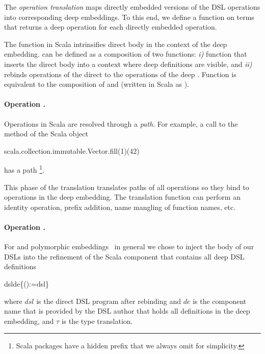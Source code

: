The \emph{operation translation} maps directly embedded versions of the
  DSL operations into corresponding deep embeddings. To this end, we define a
  function  on terms that returns a deep operation for each directly
  embedded operation.

The  function in Scala intrinsifies direct \edsl body in the context of the deep embedding.
  can be defined as a composition of two functions: \emph{i)} function  that inserts the direct \edsl body
  into a context where deep \edsl definitions are visible, and \emph{ii)} 
  rebinds operations of the direct \edsl to the operations of the deep \edsl. Function  is equivalent to
  the composition of  and  (written in Scala as ).

\paragraph{Operation .} Operations in Scala are resolved through a \emph{path}. For example, a call to the  method
  of the Scala object \begin{lstparagraph}
scala.collection.immutable.Vector.fill(1)(42)
\end{lstparagraph}
  has a path \footnote{Scala packages have a hidden prefix  that we always omit for simplicity.}.

This phase of the translation translates paths of all operations so they bind
 to operations in the deep embedding. The translation function can perform an
 identity operation, prefix addition, name mangling of function names, etc.


\paragraph{Operation .} For \yy and polymorphic embeddings~\cite{hofer_polymorphic_2008}
in general we chose to inject the body of our DSLs into the refinement of the Scala component that
contains all deep DSL definitions

  \infyyax{}
   {dsl}{\;\;de\;\;\{\;\;\;\;():\;\;\ttother[T]\;=\;dsl\;\}}

where $dsl$ is the direct DSL program after rebinding and $de$ is the component name
that is provided by the DSL author that holds all definitions in the deep embedding, and
$\tau$ is the type translation.

